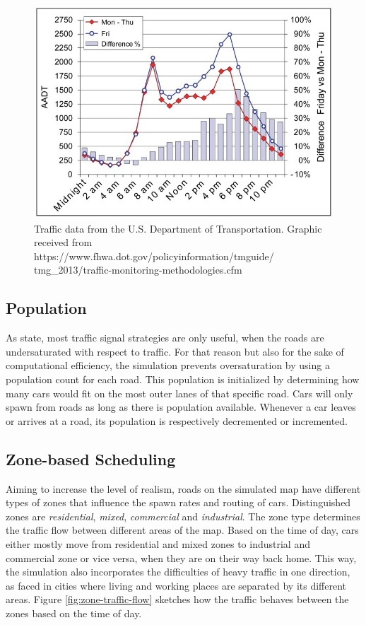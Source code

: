 \documentclass[11pt]{article}
\begin{document}
\begin{figure}[t]
	\includegraphics[width=\linewidth]{img/traffic-data.jpeg}
	\caption{Traffic data from the U.S. Department of Transportation. Graphic received from https://www.fhwa.dot.gov/policyinformation/tmguide/
	tmg\_2013/traffic-monitoring-methodologies.cfm \label{fig:traffic-data}}
\end{figure} 

\subsection{Population}
As \citet{papageorgiou2003review} state, most traffic signal strategies are only useful, when the roads are undersaturated with respect to traffic. For that reason but also for the sake of computational efficiency, the simulation prevents oversaturation by using a population count for each road. This population is initialized by determining how many cars would fit on the most outer lanes of that specific road. Cars will only spawn from roads as long as there is population available. Whenever a car leaves or arrives at a road, its population is respectively decremented or incremented.

\subsection{Zone-based Scheduling}
Aiming to increase the level of realism, roads on the simulated map have different types of zones that influence the spawn rates and routing of cars. Distinguished zones are \textit{residential}, \textit{mixed}, \textit{commercial} and \textit{industrial}. The zone type determines the traffic flow between different areas of the map. Based on the time of day, cars either mostly move from residential and mixed zones to industrial and commercial zone or vice versa, when they are on their way back home. This way, the simulation also incorporates the difficulties of heavy traffic in one direction, as faced in cities where living and working places are separated by its different areas. Figure \ref{fig:zone-traffic-flow} sketches how the traffic behaves between the zones based on the time of day.
\end{document}
